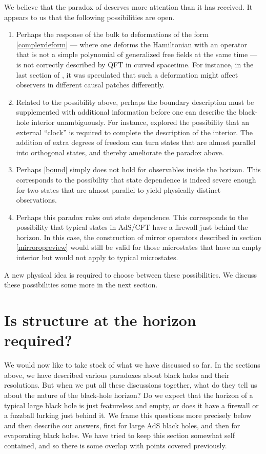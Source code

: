 \documentclass[12pt]{article}
\begin{document}
We believe that the paradox of \cite{Marolf:2015dia} deserves more attention than it has received. It appears to us that the following possibilities are open.
\begin{enumerate}
\item
Perhaps the response of the bulk to deformations of the form \eqref{complexdeform} --- where one deforms the Hamiltonian with an operator that is not a simple polynomial of generalized free fields at the same time  ---  is not correctly described by QFT in curved spacetime. For instance, in the last section of \cite{Raju:2016vsu}, it was speculated that such a deformation might affect observers in different causal patches differently. 
\item
\label{possadditional}
Related to the possibility above, perhaps the boundary description must be supplemented with additional information before one can describe the black-hole interior unambiguously. For instance, \cite{vanBreukelen:2019zxq} explored the possibility that an external ``clock'' is required to complete the description of the interior. The addition of extra degrees of freedom can turn states that are almost parallel into orthogonal states, and thereby ameliorate the paradox above.
\item
Perhaps \eqref{bound} simply does not hold for observables inside the horizon. This corresponds to the possibility that state dependence is indeed severe enough for two states that are almost parallel to yield physically distinct observations.
\item
Perhaps this paradox  rules out state dependence. This corresponds to the possibility that typical states in AdS/CFT have a firewall just behind the horizon. In this case, the construction of mirror operators described in section \ref{mirroropreview} would still be valid for those microstates that have an empty interior but would not apply to typical microstates. 
\end{enumerate}
A new physical idea is required to choose between these possibilities. We discuss these possibilities some more in the next section.

\section{Is structure at the horizon required? \label{secisstructure}}

We would now like to take stock of what we have discussed so far. In the sections above, we have described various paradoxes about black holes and their resolutions.  But when we put all these discussions together, what do they tell us about the nature of the black-hole horizon? Do we expect that the horizon of a typical large black hole is just featureless and empty, or does it have a firewall or a fuzzball lurking just behind it. We frame this questions more precisely below and then describe our answers, first for large AdS black holes, and then for evaporating black holes.  We have tried to keep this section somewhat self contained, and so there is some overlap with points covered previously.
\end{document}
